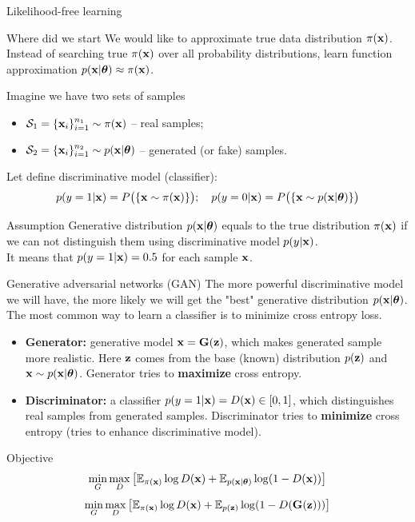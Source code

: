 \begin{frame}{Likelihood-free learning}
	\begin{block}{Where did we start}
	 We would like to approximate true data distribution $\pi(\mathbf{x})$.
	Instead of searching true $\pi(\mathbf{x})$ over all probability distributions, learn function approximation $p(\mathbf{x} | \boldsymbol{\theta}) \approx \pi(\mathbf{x})$.
	\end{block}
	Imagine we have two sets of samples 
	\begin{itemize}
		\item $\mathcal{S}_1 = \{\mathbf{x}_i\}_{i=1}^{n_1} \sim \pi(\mathbf{x})$ -- real samples;
		\item $\mathcal{S}_2 = \{\mathbf{x}_i\}_{i=1}^{n_2} \sim p(\mathbf{x} | \boldsymbol{\theta})$ -- generated (or fake) samples.
	\end{itemize}
	Let define discriminative model (classifier):
	\[
		p(y = 1 | \mathbf{x}) = P\bigl(\{\mathbf{x} \sim \pi(\mathbf{x})\}\bigr); \quad p(y = 0 | \mathbf{x}) = P\bigl(\{\mathbf{x} \sim p(\mathbf{x} | \boldsymbol{\theta})\}\bigr)
	\]
	\vspace{-0.5cm}
	\begin{block}{Assumption}
		Generative distribution $p(\mathbf{x} | \boldsymbol{\theta})$ equals to the true distribution $\pi(\mathbf{x})$ if we can not distinguish them using discriminative model $p(y | \mathbf{x})$. \\
		It means that $p(y = 1 | \mathbf{x}) = 0.5$ for each sample $\mathbf{x}$.
	\end{block}

\end{frame}
\begin{frame}{Generative adversarial networks (GAN)}
	The more powerful discriminative model we will have, the more likely we will get the "best" generative distribution $p(\mathbf{x} | \boldsymbol{\theta})$. \\
	The most common way to learn a classifier is to minimize cross entropy loss.
	\begin{itemize}
		\item \textbf{Generator:} generative model $\mathbf{x} = \mathbf{G}(\mathbf{z})$, which makes generated sample more realistic. Here $\mathbf{z}$ comes from the base (known) distribution $p(\mathbf{z})$ and $\mathbf{x} \sim p(\mathbf{x} | \boldsymbol{\theta})$. Generator tries to \textbf{maximize} cross entropy.
		\item \textbf{Discriminator:} a classifier $p(y = 1 | \mathbf{x}) = D(\mathbf{x}) \in [0, 1]$, which distinguishes real samples from generated samples. Discriminator tries to \textbf{minimize} cross entropy (tries to enhance discriminative model).
	\end{itemize}
	\begin{block}{Objective}
		\vspace{-0.5cm}
		\[
			\min_{G} \max_D \left[ \mathbb{E}_{\pi(\mathbf{x})} \log D(\mathbf{x}) + \mathbb{E}_{p(\mathbf{x} | \boldsymbol{\theta})} \log (1 - D(\mathbf{x})) \right] 
		\]
		\[
			\min_{G} \max_D \left[ \mathbb{E}_{\pi(\mathbf{x})} \log D(\mathbf{x}) + \mathbb{E}_{p(\mathbf{z})} \log (1 - D(\mathbf{G}(\mathbf{z}))) \right]
		\]
	\end{block}
\end{frame}
